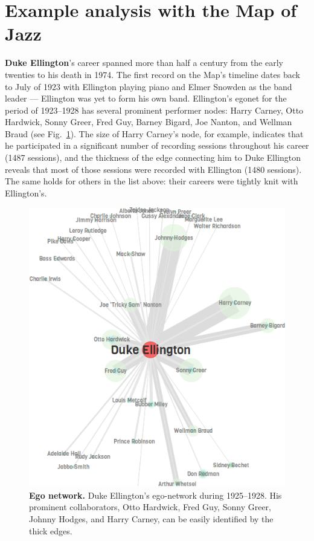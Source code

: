 \documentclass[12pt]{cmuthesis}
\begin{document}
\section{Example analysis with the Map of Jazz}

  \textbf{Duke Ellington}'s career spanned more than half a century from the early twenties to his death in 1974. The first record on the Map's timeline dates back to July of 1923 with Ellington playing piano and Elmer Snowden as the band leader --- Ellington was yet to form his own band. Ellington's egonet for the period of 1923--1928 has several prominent performer nodes: Harry Carney, Otto Hardwick, Sonny Greer, Fred Guy,  Barney Bigard, Joe Nanton, and Wellman Braud (see Fig.~\ref{fig:moj:duke-ell}). The size of Harry Carney's node, for example, indicates that he participated in a significant number of recording sessions throughout his career (1487 sessions), and the thickness of the edge connecting him to Duke Ellington reveals that most of those sessions were recorded with Ellington (1480 sessions). The same holds for others in the list above: their careers were tightly knit with Ellington's.


  \begin{figure}[tb!]
    \centering
    \includegraphics[width=0.7\linewidth]{figures/duke-ellington-1925-1928}
    \caption{\textbf{Ego network.} Duke Ellington's ego-network during 1925--1928. His prominent collaborators, Otto Hardwick, Fred Guy, Sonny Greer, Johnny Hodges, and Harry Carney, can be easily identified by the thick edges.}
    \label{fig:moj:duke-ell}
  \end{figure}
\end{document}
